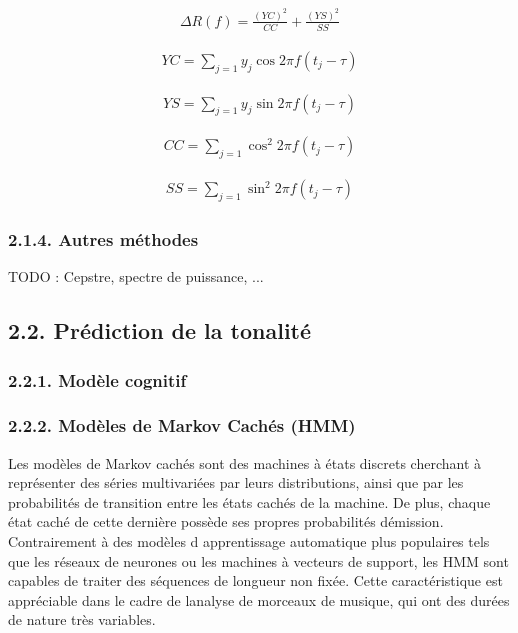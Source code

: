 \documentclass[letterpaper]{article}
\begin{document}
\begin{align}
\Delta R(f) = \frac{(YC)^{2}}{CC} 
+ \frac{(YS)^{2}}{SS}
\end{align}

\begin{align}
YC = \sum\limits_{j=1} y_{j}\cos 2\pi f (t_{j} - \tau)
\end{align}

\begin{align}
YS = \sum\limits_{j=1} y_{j}\sin 2\pi f (t_{j} - \tau)
\end{align}

\begin{align}
CC = \sum\limits_{j=1} \cos^{2} 2\pi f (t_{j} - \tau)
\end{align}

\begin{align}
SS = \sum\limits_{j=1} \sin^{2} 2\pi f (t_{j} - \tau)
\end{align}

\subsubsection*{2.1.4. Autres méthodes}

TODO : Cepstre, spectre de puissance, ...

\subsection*{2.2. Prédiction de la tonalité}

\subsubsection*{2.2.1. Modèle cognitif}

\subsubsection*{2.2.2. Modèles de Markov Cachés (HMM)}

Les modèles de Markov cachés sont des machines à états discrets cherchant à représenter des séries multivariées par
leurs distributions, ainsi que par les probabilités de transition entre les états cachés de la machine. De plus, chaque état
caché de cette dernière possède ses propres probabilités d\textquotesingle émission. Contrairement à des modèles d\textquotesingle
apprentissage automatique plus populaires tels que les réseaux de neurones ou les machines à vecteurs de support,
les HMM sont capables de traiter des séquences de longueur non fixée. Cette caractéristique est appréciable dans le cadre
de l\textquotesingle analyse de morceaux de musique, qui ont des durées de nature très variables.
\end{document}

